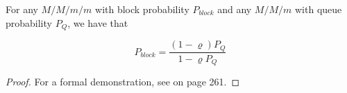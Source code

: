 \begin{theorem}
\label{thm:Relation-Probability-Block-Probability-Queue}	
	For any $M/M/m/m$ with block probability $P_{block}$ and any $M/M/m$ with queue probability $P_{Q}$, we have that
	 
	\begin{equation}
	\label{eqn:Relation-Probability-Block-Probability-Queue}
	P_{block} = \frac{(1-\varrho)P_{Q}}{1-\varrho P_{Q}}
	\end{equation}
	
	\begin{proof}
		For a formal demonstration, see \cite{harchol2013performance} on page 261.
	\end{proof}
\end{theorem}